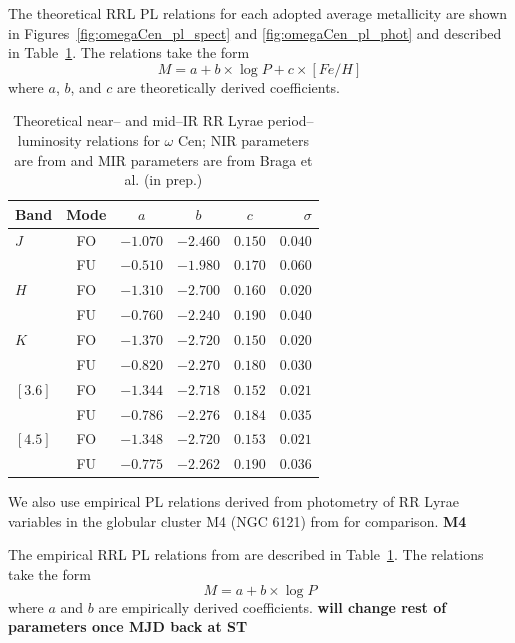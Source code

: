 \documentclass[a4paper,fleqn,usenatbib]{mnras}
\begin{document}
The theoretical RRL PL relations for each adopted average metallicity are shown in Figures~\ref{fig:omegaCen_pl_spect} and \ref{fig:omegaCen_pl_phot} and described in Table~\ref{tab:pl_table_theo}. The relations take the form
\begin{equation}M = a + b\times\log P + c\times[Fe/H]\end{equation}
where $a$, $b$, and $c$ are theoretically derived coefficients.

\begin{table}
\centering
\caption{Theoretical near-- and mid--IR RR Lyrae period--luminosity relations for $\omega$ Cen; NIR parameters are from \citet{2015ApJ...808...50M} and MIR parameters are from Braga et al. (in prep.)}
\label{tab:pl_table_theo}
\begin{tabular}{l||c|c|c|c|r} 
\hline \hline
Band & Mode & $a$   & $b$   & $c$   & $\sigma$ \\
\hline
$J$ & FO & $-1.070$ & $-2.460$ & $0.150$ & $0.040$ \\
       & FU & $-0.510$ & $-1.980$ & $0.170$ & $0.060$ \\
$H$ & FO & $-1.310$ & $-2.700$ & $0.160$ & $0.020$\\
       & FU & $-0.760$ & $-2.240$ & $0.190$ & $0.040$\\
$K$ & FO & $-1.370$ & $-2.720$ & $0.150$ & $0.020$ \\
       & FU & $-0.820$ & $-2.270$ & $0.180$ & $0.030$\\
$[3.6]$ & FO & $-1.344$ & $-2.718$ & $0.152$ & $0.021$ \\
            & FU & $-0.786$ & $-2.276$ & $0.184$ & $0.035$ \\
$[4.5]$ & FO & $-1.348$ & $-2.720$ & $0.153$ & $0.021$ \\         
            & FU & $-0.775$ & $-2.262$ & $0.190$ & $0.036$ \\
            \hline
\end{tabular}
\end{table}

We also use empirical PL relations derived from photometry of RR Lyrae variables in the globular cluster M4 (NGC 6121) from \citet{2015arXiv150507858N} for comparison. {\bf M4 }

The empirical RRL PL relations from \citet{2015arXiv150507858N} are described in Table~\ref{tab:pl_table_theo}. The relations take the form
\begin{equation}M = a + b\times\log P \end{equation}
where $a$ and $b$ are empirically derived coefficients. {\bf will change rest of parameters once MJD back at ST }
\end{document}

